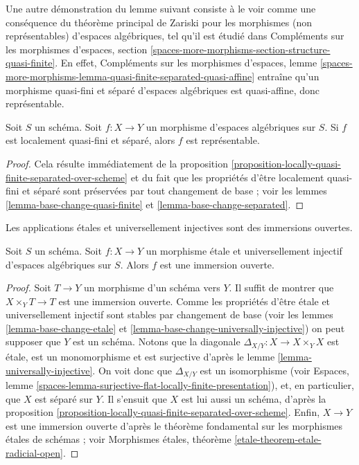 \noindent
Une autre démonstration du lemme suivant consiste à le voir comme une conséquence
du théorème principal de Zariski pour les morphismes (non représentables) d'espaces algébriques,
tel qu'il est étudié dans Compléments sur les morphismes d'espaces, section
\ref{spaces-more-morphisms-section-structure-quasi-finite}.
En effet, Compléments sur les morphismes d'espaces, lemme
\ref{spaces-more-morphisms-lemma-quasi-finite-separated-quasi-affine}
entraîne qu'un morphisme quasi-fini et séparé d'espaces algébriques
est quasi-affine, donc représentable.

\begin{lemma}
\label{lemma-locally-quasi-finite-separated-representable}
Soit $S$ un schéma. Soit $f : X \to Y$ un morphisme d'espaces
algébriques sur $S$. Si $f$ est localement quasi-fini et séparé, alors
$f$ est représentable.
\end{lemma}

\begin{proof}
Cela résulte immédiatement de la
proposition \ref{proposition-locally-quasi-finite-separated-over-scheme}
et du fait que les propriétés d'être localement quasi-fini et séparé sont
préservées par tout changement de base ; voir les
lemmes \ref{lemma-base-change-quasi-finite} et
\ref{lemma-base-change-separated}.
\end{proof}

\begin{lemma}
\label{lemma-etale-universally-injective-open}
\begin{slogan}
Les applications étales et universellement injectives sont des immersions ouvertes.
\end{slogan}
Soit $S$ un schéma. Soit $f : X \to Y$ un morphisme étale et universellement
injectif d'espaces algébriques sur $S$. Alors $f$ est une
immersion ouverte.
\end{lemma}

\begin{proof}
Soit $T \to Y$ un morphisme d'un schéma vers $Y$.
Il suffit de montrer que $X \times_Y T \to T$ est une immersion ouverte.
Comme les propriétés d'être étale et universellement injectif sont
stables par changement de base (voir les
lemmes \ref{lemma-base-change-etale} et
\ref{lemma-base-change-universally-injective})
on peut supposer que $Y$ est un schéma. Notons que la
diagonale $\Delta_{X/Y} : X \to X \times_Y X$ est étale, est un monomorphisme et
est surjective d'après le
lemme \ref{lemma-universally-injective}.
On voit donc que $\Delta_{X/Y}$ est un isomorphisme (voir
Espaces, lemme
\ref{spaces-lemma-surjective-flat-locally-finite-presentation}),
et, en particulier, que $X$ est séparé sur $Y$.
Il s'ensuit que $X$ est lui aussi un schéma, d'après la
proposition \ref{proposition-locally-quasi-finite-separated-over-scheme}.
Enfin, $X \to Y$ est une immersion ouverte d'après le théorème fondamental
sur les morphismes étales de schémas ; voir
Morphismes étales, théorème \ref{etale-theorem-etale-radicial-open}.
\end{proof}



